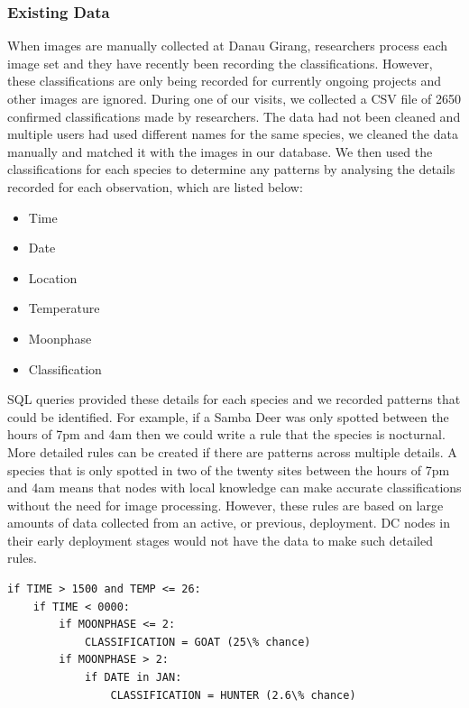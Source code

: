 			\subsubsection{Existing Data}
			When images are manually collected at Danau Girang, researchers process each image set and they have recently been recording the classifications. However, these classifications are only being recorded for currently ongoing projects and other images are ignored. During one of our visits, we collected a CSV file of 2650 confirmed classifications made by researchers. The data had not been cleaned and multiple users had used different names for the same species, we cleaned the data manually and matched it with the images in our database.
			We then used the classifications for each species to determine any patterns by analysing the details recorded for each observation, which are listed below:
			\begin{itemize}
				\item Time
				\item Date
				\item Location
				\item Temperature
				\item Moonphase
				\item Classification
			\end{itemize}
			
			SQL queries provided these details for each species and we recorded patterns that could be identified. For example, if a Samba Deer was only spotted between the hours of 7pm and 4am then we could write a rule that the species is nocturnal. More detailed rules can be created if there are patterns across multiple details. A species that is only spotted in two of the twenty sites between the hours of 7pm and 4am means that nodes with local knowledge can make accurate classifications without the need for image processing. However, these rules are based on large amounts of data collected from an active, or previous, deployment. DC nodes in their early deployment stages would not have the data to make such detailed rules.

				\begin{lstlisting}[breaklines=true, caption={Example Rule created from Existing Data}, label={imp:lst:rule1}]
if TIME > 1500 and TEMP <= 26:
    if TIME < 0000:
        if MOONPHASE <= 2:
            CLASSIFICATION = GOAT (25\% chance)
        if MOONPHASE > 2:
            if DATE in JAN:
                CLASSIFICATION = HUNTER (2.6\% chance)
				\end{lstlisting}
			
